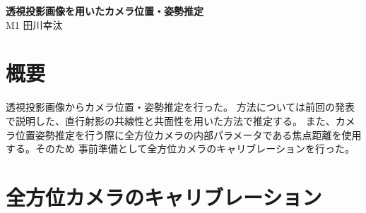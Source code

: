 \documentclass[]{jarticle}          %
\begin{document}

\vspace*{2ex}
\begin{center}
 {\Large \bf 透視投影画像を用いたカメラ位置・姿勢推定}\\ %
 \vspace*{5mm}
 {\large M1 田川幸汰}%
\end{center}






\section{概要}
透視投影画像からカメラ位置・姿勢推定を行った。
方法については前回の発表で説明した、直行射影の共線性と共面性を用いた方法\cite{bib_1}で推定する。
また、カメラ位置姿勢推定を行う際に全方位カメラの内部パラメータである焦点距離を使用する。そのため
事前準備として全方位カメラのキャリブレーションを行った。

\section{全方位カメラのキャリブレーション}
\end{document}
